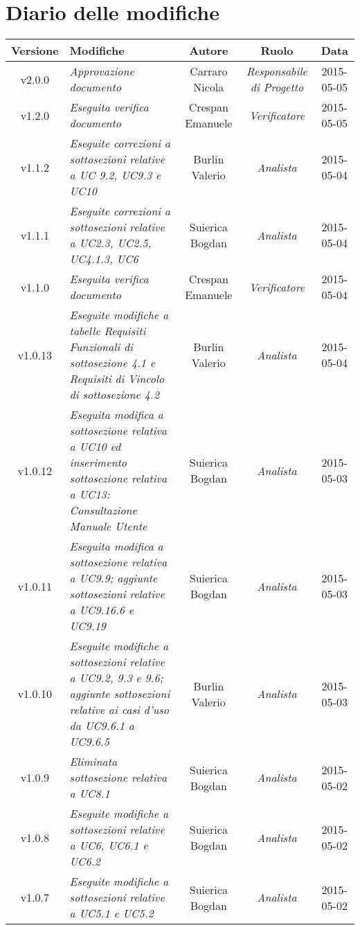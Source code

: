 \newpage
\section*{Diario delle modifiche}

\begin{table}[h]
\centering
\begin{tabular}{|c|p{}|c|c|c|}
	\toprule
		\textbf{Versione} & \textbf{Modifiche} & \textbf{Autore} & \textbf{Ruolo} & \textbf{Data}\\
	\midrule
	\midrule
		v2.0.0 & \textit{Approvazione documento} & Carraro Nicola & \textit{Responsabile di Progetto} & 2015-05-05 \\
	\midrule
		v1.2.0 & \textit{Eseguita verifica documento} & Crespan Emanuele & \textit{Verificatore} & 2015-05-05 \\
	\midrule
		v1.1.2 & \textit{Eseguite correzioni a sottosezioni relative a UC 9.2, UC9.3 e UC10} & Burlin Valerio & \textit{Analista} & 2015-05-04\\
	\midrule
		v1.1.1 & \textit{Eseguite correzioni a sottosezioni relative a UC2.3, UC2.5, UC4.1.3, UC6} & Suierica Bogdan & \textit{Analista} & 2015-05-04\\
	\midrule
		v1.1.0 & \textit{Eseguita verifica documento} & Crespan Emanuele & \textit{Verificatore} & 2015-05-04\\
	\midrule
		v1.0.13 & \textit{Eseguite modifiche a tabelle Requisiti Funzionali di sottosezione 4.1 e Requisiti di Vincolo di sottosezione 4.2} & Burlin Valerio & \textit{Analista} & 2015-05-04\\
	\midrule
		v1.0.12 & \textit{Eseguita modifica a sottosezione relativa a UC10 ed inserimento sottosezione relativa a UC13: Consultazione Manuale Utente} & Suierica Bogdan & \textit{Analista} & 2015-05-03\\
	\midrule
		v1.0.11 & \textit{Eseguita modifica a sottosezione relativa a UC9.9; aggiunte sottosezioni relative a UC9.16.6 e UC9.19} & Suierica Bogdan & \textit{Analista} & 2015-05-03\\
	\midrule
		v1.0.10 & \textit{Eseguite modifiche a sottosezioni relative a UC9.2, 9.3 e 9.6; aggiunte sottosezioni relative ai casi d'uso da UC9.6.1 a UC9.6.5} & Burlin Valerio & \textit{Analista} & 2015-05-03\\
	\midrule
		v1.0.9 & \textit{Eliminata sottosezione relativa a UC8.1} & Suierica Bogdan & \textit{Analista} & 2015-05-02\\
	\midrule
		v1.0.8 & \textit{Eseguite modifiche a sottosezioni relative a UC6, UC6.1 e UC6.2} & Suierica Bogdan & \textit{Analista} & 2015-05-02\\
	\midrule
		v1.0.7 & \textit{Eseguite modifiche a sottosezioni relative a UC5.1 e UC5.2} & Suierica Bogdan & \textit{Analista} & 2015-05-02\\
	\bottomrule
\end{tabular}
\end{table}
